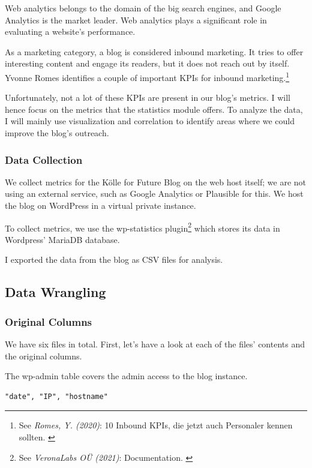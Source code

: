 Web analytics belongs to the domain of the big search engines, and Google Analytics is the market leader. Web analytics plays a significant role in evaluating a website's performance.

As a marketing category, a blog is considered inbound marketing. It tries to offer interesting content and engage its readers, but it does not reach out by itself. Yvonne Romes identifies a couple of important KPIs for inbound marketing.\footnote{See \textit{Romes, Y. (2020)}: 10 Inbound KPIs, die jetzt auch Personaler kennen sollten. \cite{inboundKPI}}

Unfortunately, not a lot of these KPIs are present in our blog's metrics. I will hence focus on the metrics that the statistics module offers. To analyze the data, I will mainly use visualization and correlation to identify areas where we could improve the blog's outreach.

\subsubsection{Data Collection}

We collect metrics for the Kölle for Future Blog on the web host itself; we are not using an external service, such as Google Analytics or Plausible for this. We host the blog on WordPress in a virtual private instance.

To collect metrics, we use the wp-statistics plugin\footnote{See \textit{VeronaLabs OÜ (2021)}: Documentation. \cite{wpStatistics}} which stores its data in Wordpress' MariaDB database.

I exported the data from the blog as CSV files for analysis.

\subsection{Data Wrangling}

\subsubsection{Original Columns}

We have six files in total. First, let's have a look at each of the files' contents and the original columns.

The wp-admin table covers the admin access to the blog instance.
\begin{lstlisting}[caption=wp-admin, frame=single, basicstyle=\ttfamily]
"date", "IP", "hostname"
\end{lstlisting}

